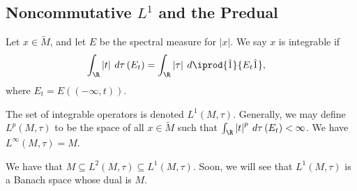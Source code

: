 \documentclass[10pt]{mypackage}
\begin{document}
\subsection{Noncommutative $L^1$ and the Predual}%
\begin{definition}
  Let $x\in \widetilde{M}$, and let $E$ be the spectral measure for $\left\vert x \right\vert$. We say $x$ is integrable if
  \begin{align*}
    \int_{\R}^{} \left\vert t \right\vert\:d\tau\left( E_t \right) &= \int_{\R}^{} \left\vert \tau \right\vert\:d \iprod{\hat{1}}{E_t\hat{1}},
  \end{align*}
  where $E_t = E\left( \left( -\infty,t \right) \right)$.
\end{definition}
The set of integrable operators is denoted $L^1\left( M,\tau \right)$. Generally, we may define $L^p\left( M,\tau \right)$ to be the space of all $x\in \widetilde{M}$ such that $ \int_{\R}^{} \left\vert t \right\vert^{p}\:d\tau\left( E_t \right) < \infty $. We have $L^{\infty}\left( M,\tau \right) = M$.

We have that $M\subseteq L^2\left( M,\tau \right)\subseteq L^1\left( M,\tau \right)$. Soon, we will see that $L^1\left( M,\tau \right)$ is a Banach space whose dual is $M$.
\end{document}
